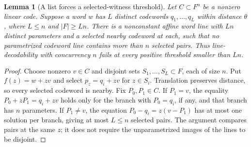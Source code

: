 \documentclass[11pt,letterpaper]{article}
\newtheorem{lemma}[theorem]{Lemma}
\theoremstyle{definition}
\theoremstyle{remark}
\begin{document}
\begin{lemma}[A list forces a selected-witness threshold]\label{fg:graphs}
Let $C\subset F^n$ be a nonzero linear code. Suppose a word $w$ has
$L$ distinct codewords $q_1,\ldots,q_L$ within distance $\theta$,
where $L\le n$ and $|F|\ge Ln$. There is a nonconstant affine word line
with $Ln$ distinct parameters and a selected nearby codeword at each,
such that no parametrized codeword line contains more than $n$ selected
pairs. Thus line-decodability with concurrency $n$ fails at every
positive threshold smaller than $Ln$.
\end{lemma}
\begin{proof}
Choose nonzero $v\in C$ and disjoint sets $S_1,\ldots,S_L\subset F$,
each of size $n$. Put $f(z)=w+zv$ and select $p_z=q_i+zv$ for $z\in S_i$.
Translation preserves distance, so every selected codeword is nearby.
Fix $P_0,P_1\in C$. If $P_1=v$, the equality
$P_0+zP_1=q_i+zv$ holds only for the branch with $P_0=q_i$, if any,
and that branch has $n$ parameters. If $P_1\ne v$, the equation
$P_0-q_i=z(v-P_1)$ has at most one solution per branch, giving at most
$L\le n$ selected pairs. The argument compares pairs at the same $z$;
it does not require the unparametrized images of the lines to be disjoint.
\end{proof}
\end{document}
